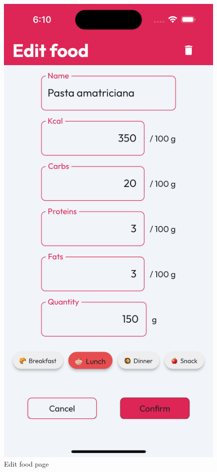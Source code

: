 \documentclass{Configuration_Files/PoliMi3i_thesis}
\begin{document}
\begin{figure}[!h]
  \includegraphics[scale=0.1]{Images/Screenshots/Mobile/EditFoodLight.png}
  \caption{Edit food page}
\end{figure}

\clearpage
\end{document}
